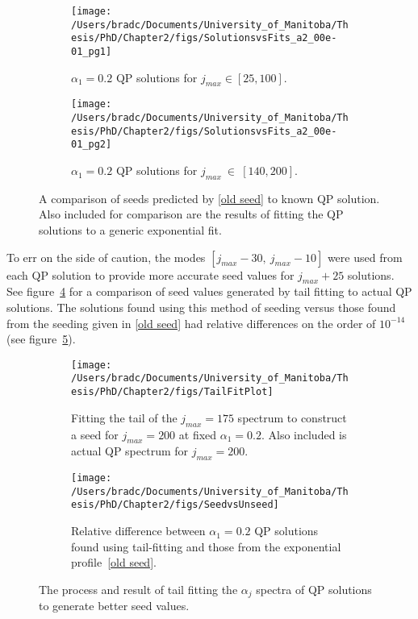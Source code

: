 \documentclass[../PhD.tex]{subfiles}
\begin{document}
\begin{subappendices}
\begin{figure}[h]
\centering
	\begin{subfigure}[t]{0.45\textwidth}
		\texttt{[image: /Users/bradc/Documents/University\_of\_Manitoba/Thesis/PhD/Chapter2/figs/SolutionsvsFits\_a2\_00e-01\_pg1]}
		\caption{$\alpha_1 = 0.2$ QP solutions for $j_{max} \in [25,100]$.}
		\label{fig: sol vs fit low jmax}
	\end{subfigure}
	\quad
	\begin{subfigure}[t]{0.45\textwidth}
		\texttt{[image: /Users/bradc/Documents/University\_of\_Manitoba/Thesis/PhD/Chapter2/figs/SolutionsvsFits\_a2\_00e-01\_pg2]}
		\caption{$\alpha_1 = 0.2$ QP solutions for $j_{max}~\in~[140,200]$.}
		\label{fig: sol vs fit high jmax}
	\end{subfigure}
	\caption[Comparison of seed values to known QP solutions and exponential fitting]{A comparison of seeds predicted by \eqref{old seed} to known QP solution. Also included for comparison are the results of fitting the QP solutions to a generic exponential fit.}
	\label{fig: solutionfitting}
\end{figure}
			

To err on the side of caution, the modes $[ j_{max} - 30,\: j_{max} - 10]$ were used from each QP solution to provide more accurate seed values for $j_{max} + 25$ solutions. See figure~\ref{fig: tail fitting} for a comparison of seed values generated by tail fitting to actual QP solutions. The solutions found using this method of seeding versus those found from the seeding given in \eqref{old seed} had relative differences on the order of $10^{-14}$ (see figure~\ref{fig: seedvsunseed}).

\begin{figure}[h]
	\centering
	\begin{subfigure}[t]{0.45\textwidth}
  		\texttt{[image: /Users/bradc/Documents/University\_of\_Manitoba/Thesis/PhD/Chapter2/figs/TailFitPlot]}
  		\caption{Fitting the tail of the $j_{max} = 175$ spectrum to construct a seed for $j_{max} = 200$ at fixed $\alpha_1 = 0.2$. Also included is actual QP spectrum for $j_{max} = 200$.}
  		\label{fig: tail fitting}
	\end{subfigure}
	\;
	\begin{subfigure}[t]{0.45\textwidth}
		\texttt{[image: /Users/bradc/Documents/University\_of\_Manitoba/Thesis/PhD/Chapter2/figs/SeedvsUnseed]}
		\caption{Relative difference between $\alpha_1=0.2$ QP solutions found using tail-fitting and those from the exponential profile~\eqref{old seed}.}
		\label{fig: seedvsunseed}
	\end{subfigure}
	\caption[Illustrating the tail fitting procedure]{The process and result of tail fitting the $\alpha_j$ spectra of QP solutions to generate better seed values.}
   	\label{fig: fit & resids}
\end{figure}


\end{subappendices}
\end{document}
